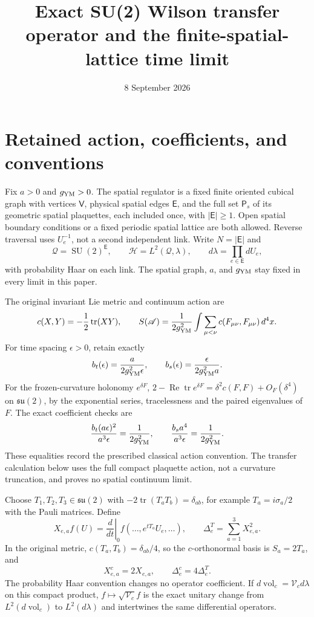 \documentclass[11pt]{article}
\title{Exact SU(2) Wilson transfer operator and the finite-spatial-lattice time limit}
\author{}
\date{8 September 2026}
\newcommand{\SU}{\operatorname{SU}}
\newcommand{\tr}{\operatorname{tr}}
\newcommand{\Rea}{\operatorname{Re}}
\begin{document}
\maketitle

\section{Retained action, coefficients, and conventions}

Fix $a>0$ and $g_{\rm YM}>0$. The spatial regulator is a fixed finite
oriented cubical graph with vertices $\mathsf V$, physical spatial edges
$\mathsf E$, and the full set $\mathsf P_s$ of its geometric spatial
plaquettes, each included once, with $|\mathsf E|\geq1$.
Open spatial boundary conditions or a
fixed periodic spatial lattice are both allowed. Reverse traversal uses
$U_e^{-1}$, not a second independent link. Write $N=|\mathsf E|$ and
\[
 \mathcal Q=\SU(2)^{\mathsf E},\qquad
 \mathcal H=L^2(\mathcal Q,\lambda),\qquad
 d\lambda=\prod_{e\in\mathsf E}dU_e,
\]
with probability Haar on each link. The spatial graph, $a$, and
$g_{\rm YM}$ stay fixed in every limit in this paper.

The original invariant Lie metric and continuum action are
\begin{equation}\label{eq:original-action}
 c(X,Y)=-\frac12\tr(XY),\qquad
 S(\mathscr A)=\frac1{2g_{\rm YM}^2}
 \int\sum_{\mu<\nu}c(F_{\mu\nu},F_{\mu\nu})\,d^4x.
\end{equation}
For time spacing $\epsilon>0$, retain exactly
\begin{equation}\label{eq:anisotropic}
 b_t(\epsilon)=\frac{a}{2g_{\rm YM}^2\epsilon},\qquad
 b_s(\epsilon)=\frac{\epsilon}{2g_{\rm YM}^2a}.
\end{equation}
For the frozen-curvature holonomy $e^{\delta F}$,
$2-\Rea\tr e^{\delta F}=\delta^2c(F,F)+O_F(\delta^4)$ on
$\mathfrak{su}(2)$, by the exponential series, tracelessness and the
paired eigenvalues of $F$. The exact coefficient checks are
\[
 \frac{b_t(a\epsilon)^2}{a^3\epsilon}
 =\frac1{2g_{\rm YM}^2},\qquad
 \frac{b_sa^4}{a^3\epsilon}=\frac1{2g_{\rm YM}^2}.
\]
These equalities record the prescribed classical action convention.
The transfer calculation below uses the full compact plaquette action,
not a curvature truncation, and proves no spatial continuum limit.

Choose $T_1,T_2,T_3\in\mathfrak{su}(2)$ with
$-2\tr(T_aT_b)=\delta_{ab}$, for example $T_a=i\sigma_a/2$ with the
Pauli matrices. Define
\[
 X_{e,a}f(U)=\left.\frac d{dt}\right|_{0}
 f(\ldots,e^{tT_a}U_e,\ldots),\qquad
 \Delta_e^T=\sum_{a=1}^3X_{e,a}^2.
\]
In the original metric, $c(T_a,T_b)=\delta_{ab}/4$, so the
$c$-orthonormal basis is $S_a=2T_a$, and
\begin{equation}\label{eq:metricdictionary}
 X^c_{e,a}=2X_{e,a},\qquad \Delta_e^c=4\Delta_e^T.
\end{equation}
The probability Haar convention changes no operator coefficient. If
$d\operatorname{vol}_c=\mathcal V_c d\lambda$ on this compact product,
$f\mapsto\sqrt{\mathcal V_c}f$ is the exact unitary change from
$L^2(d\operatorname{vol}_c)$ to $L^2(d\lambda)$ and intertwines the same
differential operators.
\end{document}
